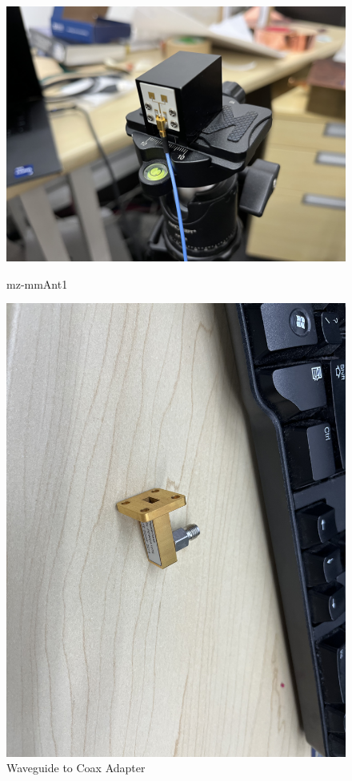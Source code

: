 \documentclass[a4paper,12pt]{report}
\begin{document}
\begin{figure}
  \centering
  \begin{minipage}{0.45\textwidth}
    \centering
    \includegraphics[clip, keepaspectratio, width=0.9\linewidth]{img/mz-mmant1.jpg}
    \caption{mz-mmAnt1}
    \label{img:mz_mmant1}
  \end{minipage}\hfill
  \begin{minipage}{0.45\textwidth}
    \centering
    \includegraphics[clip, keepaspectratio, width=0.9\linewidth]{img/waveguide_coax_adapter.jpg}
    \caption{Waveguide to Coax Adapter}
    \label{img:waveguide_coax_adapter}
  \end{minipage}\hfill
\end{figure}
\end{document}
